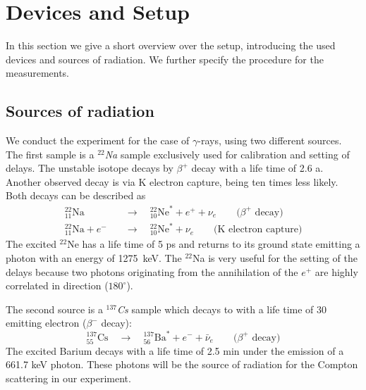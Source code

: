 \section{Devices and Setup}
In this section we give a short overview over the setup, introducing the used devices and sources of radiation. We
further specify the procedure for the measurements. 

\subsection{Sources of radiation}
\label{sec:sources}
We conduct the experiment for the case of $\gamma$-rays, using two different sources. The first sample is a 
\textit{$^{22}$Na}  sample exclusively used for calibration and setting of delays. The unstable isotope decays by 
$\beta^+$ decay with a life time of 2.6 a. Another observed decay is via K electron capture, being ten times less likely. 
Both decays can be described as
\begin{align}
_{11}^{22}\text{Na}        \quad &\rightarrow \quad _{10}^{22}\text{Ne}^* + e^+ + \nu_e	\qquad \text{($\beta^+$ decay)} \\
_{11}^{22}\text{Na} + e^-  \quad &\rightarrow \quad _{10}^{22}\text{Ne}^* + \nu_e  \qquad \text{(K electron capture)}
    \label{eq:22na_decay}
\end{align}
The excited $^{22}$Ne has a life time of 5 ps and returns to its ground state emitting a photon with an energy of 
1275~keV.\cite{lnhb} The $^{22}$Na is very useful for the setting of the delays because two photons originating from the 
annihilation of the $e^+$ are highly correlated in direction ($180^\circ$).\cite{ver}

The second source is a \textit{$^{137}$Cs} sample which decays to with a life time of 30 emitting electron 
($\beta^-$ decay):
\begin{equation}
_{55}^{137}\text{Cs} \quad \rightarrow \quad _{56}^{137}\text{Ba}^* + e^- + \bar{\nu}_e \qquad \text{($\beta^+$ decay)}
    \label{eq:137cs_decay}
\end{equation}
The excited Barium decays with a life time of 2.5 min under the emission of a 661.7 keV photon.\cite{lnhb} 
These photons will be the source of radiation for the Compton scattering in our experiment.

